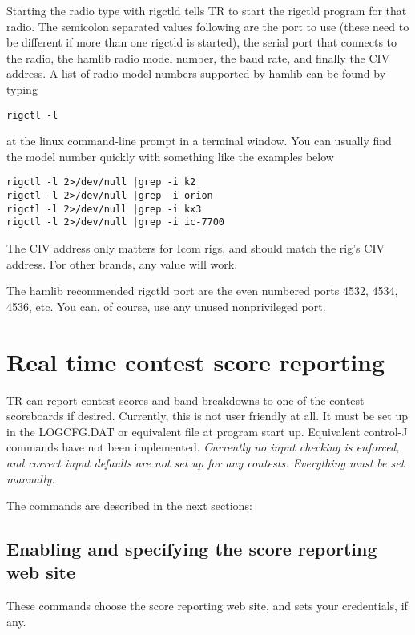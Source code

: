 \documentclass[12pt]{article}
\begin{document}
Starting the radio type with rigctld tells TR to start the rigctld
program for that radio. The semicolon separated values following are
the port to use (these need to be different if more than one rigctld is
started), the serial port that connects to the radio, the hamlib
radio model number,
the baud rate, and finally the CIV address.  A list of radio model numbers
supported by hamlib can be found by typing
\begin{verbatim}
rigctl -l
\end{verbatim}
at the linux command-line prompt in a terminal window. You can usually
find the model number quickly with something like the examples below
\begin{verbatim}
rigctl -l 2>/dev/null |grep -i k2
rigctl -l 2>/dev/null |grep -i orion
rigctl -l 2>/dev/null |grep -i kx3
rigctl -l 2>/dev/null |grep -i ic-7700
\end{verbatim}
The CIV address only matters for Icom rigs, and should match the rig's
CIV address. For other brands, any value will work.

The hamlib recommended rigctld port are the even numbered ports
4532, 4534, 4536, etc. You can,
of course, use any unused nonprivileged port.

\section{Real time contest score reporting}
TR can report contest scores and band breakdowns to one of the contest
scoreboards if desired. Currently, this is not user friendly at all.
It must be set up in the LOGCFG.DAT
or equivalent file at program start up. Equivalent control-J commands have
not been implemented.  {\em Currently no input checking is enforced,
and correct input defaults are not set up for any contests. Everything
must be set manually.}

The commands are described in the next sections:

\subsection{Enabling and specifying the score reporting web site} These
commands choose the score reporting web site, and sets your credentials,
if any.
\end{document}
